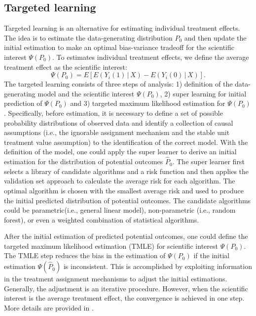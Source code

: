 	\subsection{Targeted learning} 
	Targeted learning is an alternative for estimating individual treatment effects. The idea is to estimate the data-generating distribution $P_{0}$ and then update the initial estimation to make an optimal bias-variance tradeoff for the scientific interest $\Psi(P_{0})$. To estimates individual treatment effects, we define the average treatment effect as the scientific interest:
	\begin{equation}
		\Psi(P_{0}) = E[E(Y_{i}(1)\,|\,X) - E(Y_{i}(0)\,|\,X)].
	\end{equation} 
	The targeted learning consists of three steps of analysis: 1) definition of the data-generating model and the scientific interest $\Psi(P_{0})$, 2) super learning for initial prediction of $\Psi(P_{0})$ and 3) targeted maximum likelihood estimation for $\Psi(P_{0})$ \citep{van2011targeted}. Specifically, before estimation, it is necessary to define a set of possible probability distributions of observed data and identify a collection of causal assumptions (i.e., the ignorable assignment mechanism and the stable unit treatment value assumption) to the identification of the correct model. With the definition of the model, one could apply the super learner to derive an initial estimation for the distribution of potential outcomes $\hat{P}_0$. The super learner first selects a library of candidate algorithms and a risk function and then applies the validation set approach to calculate the average risk for each algorithm. The optimal algorithm is chosen with the smallest average risk and used to produce the initial predicted distribution of potential outcomes. The candidate algorithms could be parametric(i.e., general linear model), non-parametric (i.e., random forest), or even a weighted combination of statistical algorithms. 
	
	After the initial estimation of predicted potential outcomes, one could define the targeted maximum likelihood estimation (TMLE) for scientific interest $\Psi(P_{0})$. The TMLE step reduces the bias in the estimation of $\Psi(P_{0})$ if the initial estimation $\Psi(\hat{P}_0)$ is inconsistent. This is accomplished by exploiting information in the treatment assignment mechanisms to adjust the initial estimations. Generally, the adjustment is an iterative procedure. However, when the scientific interest is the average treatment effect, the convergence is achieved in one step. More details are provided in \citet{gruber2011tmle}.    
	
